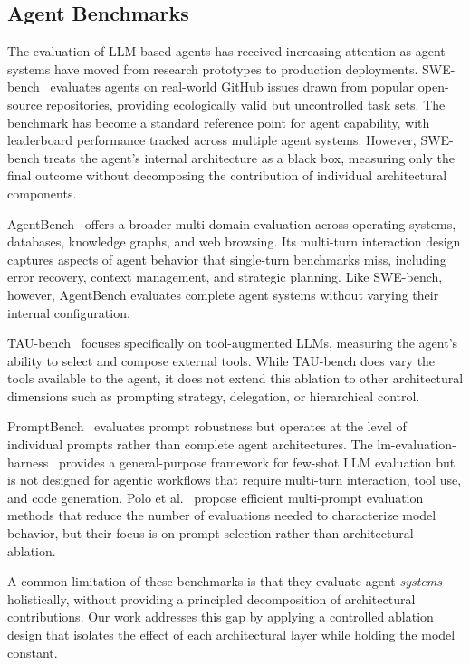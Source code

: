\documentclass[11pt]{article}
\begin{document}
\subsection{Agent Benchmarks}
\label{sec:agent_benchmarks}

The evaluation of LLM-based agents has received increasing attention as agent
systems have moved from research prototypes to production deployments.
SWE-bench~\cite{jimenez2024swebench} evaluates agents on real-world GitHub
issues drawn from popular open-source repositories, providing ecologically
valid but uncontrolled task sets. The benchmark has become a standard reference
point for agent capability, with leaderboard performance tracked across
multiple agent systems. However, SWE-bench treats the agent's internal
architecture as a black box, measuring only the final outcome without
decomposing the contribution of individual architectural components.

AgentBench~\cite{liu2023agentbench} offers a broader multi-domain evaluation
across operating systems, databases, knowledge graphs, and web browsing. Its
multi-turn interaction design captures aspects of agent behavior that
single-turn benchmarks miss, including error recovery, context management, and
strategic planning. Like SWE-bench, however, AgentBench evaluates complete
agent systems without varying their internal configuration.

TAU-bench~\cite{yao2024taubench} focuses specifically on tool-augmented LLMs,
measuring the agent's ability to select and compose external tools. While
TAU-bench does vary the tools available to the agent, it does not extend this
ablation to other architectural dimensions such as prompting strategy,
delegation, or hierarchical control.

PromptBench~\cite{zhu2024promptbench} evaluates prompt robustness but operates
at the level of individual prompts rather than complete agent architectures.
The lm-evaluation-harness~\cite{gao2024lmevalharness} provides a
general-purpose framework for few-shot LLM evaluation but is not designed for
agentic workflows that require multi-turn interaction, tool use, and code
generation. Polo et al.~\cite{polo2024efficient} propose efficient
multi-prompt evaluation methods that reduce the number of evaluations needed
to characterize model behavior, but their focus is on prompt selection rather
than architectural ablation.

A common limitation of these benchmarks is that they evaluate agent
\emph{systems} holistically, without providing a principled decomposition of
architectural contributions. Our work addresses this gap by applying a
controlled ablation design that isolates the effect of each architectural layer
while holding the model constant.
\end{document}
